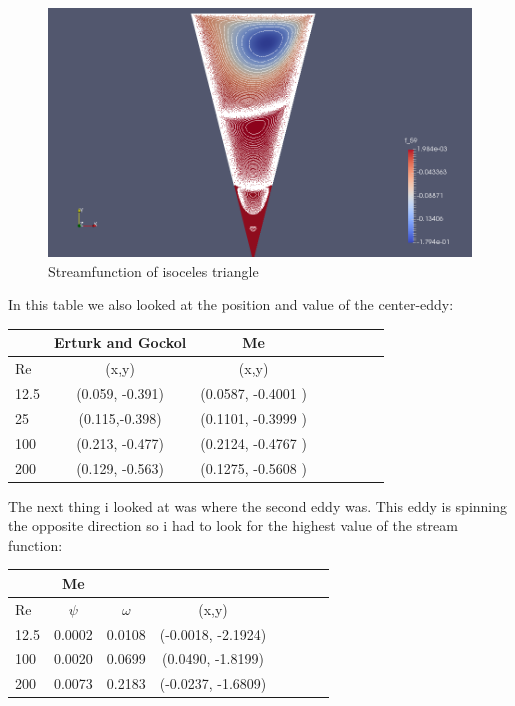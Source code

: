 \documentclass[a4paper,norsk]{article}
\begin{document}
\begin{figure}
    \centering
    \includegraphics[trim = 100mm 0mm 100mm 0mm, clip, scale=0.4]{isoceles_Re_100.png}
    \caption{Streamfunction of isoceles triangle}
    \label{fig:awesome_image}
\end{figure}
In this table we also looked at the position and value of the center-eddy:
\newline
\begin{tabular}{l*{6}{c}r}
   & Erturk and Gockol & Me\\
   \hline 
  Re &(x,y) & (x,y)  \\
12.5 & (0.059, -0.391) & (0.0587, -0.4001 )\\
25 & (0.115,-0.398) &  (0.1101, -0.3999 )\\
100 & (0.213, -0.477)& (0.2124, -0.4767 ) \\
200 & (0.129, -0.563)& (0.1275, -0.5608 )\\  
\hline
\end{tabular}
\newline
\newline
The next thing i looked at was where the second eddy was. This eddy is spinning the opposite direction so i had to look for the highest value of the stream function:
\newline
\begin{tabular}{l*{6}{c}r}
   & Me\\
   \hline 
  Re & $\psi$ & $\omega$& (x,y)   \\
12.5 & 0.0002 & 0.0108 & (-0.0018, -2.1924)\\
100 & 0.0020 & 0.0699  & (0.0490, -1.8199)\\
200 &  0.0073 & 0.2183 & (-0.0237, -1.6809)\\
\hline
\end{tabular}
\end{document}
